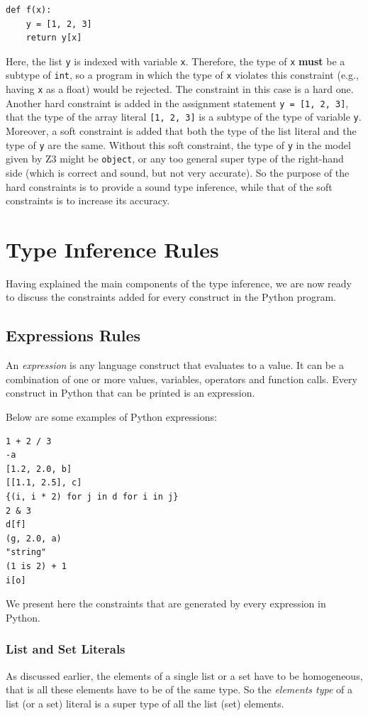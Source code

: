 \begin{lstlisting}
def f(x):
	y = [1, 2, 3]
	return y[x]
\end{lstlisting}

Here, the list \lstinline|y| is indexed with variable \lstinline|x|. Therefore, the type of \lstinline|x| \textbf{must} be a subtype of \lstinline|int|, so a program in which the type of \lstinline|x| violates this constraint (e.g., having \lstinline|x| as a float) would be rejected. The constraint in this case is a hard one. Another hard constraint is added in the assignment statement \lstinline|y = [1, 2, 3]|, that the type of the array literal \lstinline|[1, 2, 3]| is a subtype of the type of variable \lstinline|y|. Moreover, a soft constraint is added that both the type of the list literal and the type of \lstinline|y| are the same. Without this soft constraint, the type of \lstinline|y| in the model given by Z3 might be \lstinline|object|, or any too general super type of the right-hand side (which is correct and sound, but not very accurate). So the purpose of the hard constraints is to provide a sound type inference, while that of the soft constraints is to increase its accuracy.
\section{Type Inference Rules}\label{sec:rules}
Having explained the main components of the type inference, we are now ready to discuss the constraints added for every construct in the Python program.
\subsection{Expressions Rules}\label{sec:exp_rules}
An \textit{expression} is any language construct that evaluates to a value. It can be a combination of one or more values, variables, operators and function calls. Every construct in Python that can be printed is an expression.

Below are some examples of Python expressions:
\begin{lstlisting}
1 + 2 / 3
-a
[1.2, 2.0, b]
[[1.1, 2.5], c]
{(i, i * 2) for j in d for i in j}
2 & 3
d[f]
(g, 2.0, a)
"string"
(1 is 2) + 1
i[o]
\end{lstlisting}

We present here the constraints that are generated by every expression in Python.

\subsubsection{List and Set Literals}
As discussed earlier, the elements of a single list or a set have to be homogeneous, that is all these elements have to be of the same type. So the \textit{elements type} of a list (or a set) literal is a super type of all the list (set) elements.

